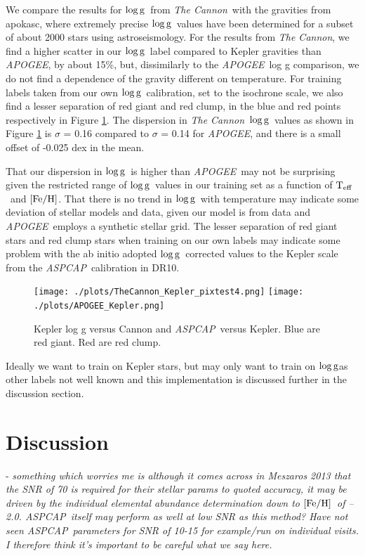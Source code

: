 \documentclass[12pt, preprint]{aastex}
\newcommand{\teff}{\mbox{$\rm T_{eff}$}}
\newcommand{\feh}{\mbox{$\rm [Fe/H]$}}
\newcommand{\logg}{\mbox{$\rm \log g$}}
\newcommand{\tc}{\textsl{The Cannon}}
\newcommand{\apogee}{\textsl{APOGEE}}
\newcommand{\aspcap}{\textsl{ASPCAP}}
\begin{document}
We compare the results for \logg\ from \tc\ with the gravities from apokasc, where extremely precise \logg\ values have been determined for a subset of about 2000 stars using astroseismology. For the results from \tc, we find a higher scatter in our \logg\ label compared to Kepler gravities than \textit{APOGEE}, by about 15\%, but, dissimilarly to the \apogee\ log g comparison, we do not find a dependence of the gravity different on temperature. For training labels taken from our own \logg\ calibration, set to the isochrone scale, we also find a lesser separation of red giant and red clump, in the blue and red points respectively in Figure \ref{fig:kepler}. The dispersion in \tc\ \logg\ values as shown in Figure \ref{fig:kepler} is $\sigma$ = 0.16 compared to $\sigma$ =  0.14 for \textit{APOGEE}, and there is a small offset of -0.025 dex in the mean. 

That our dispersion in \logg\ is higher than \apogee\ may not be surprising given the restricted range of \logg\ values in our training set as a function of \teff\ and \feh. That there is no trend in \logg\ with temperature may indicate some deviation of stellar models and data, given our model is from data and \apogee\ employs a synthetic stellar grid. The lesser separation of red giant stars and red clump stars when training on our own labels may indicate some problem with the ab initio adopted \logg\ corrected values to the Kepler scale from the \aspcap\ calibration in DR10.

  \begin{figure}[h!]
 \texttt{[image: ./plots/TheCannon\_Kepler\_pixtest4.png]}
  \texttt{[image: ./plots/APOGEE\_Kepler.png]}
 \caption{Kepler log g versus Cannon and \aspcap\ versus Kepler. Blue are red giant. Red are red clump.}
\label{fig:kepler}
\end{figure}


Ideally we want to train on Kepler stars, but may only want to train on \logg as other labels not well known and this implementation is discussed further in the discussion section. 


\section{Discussion}




- \textit{something which worries me is although it comes across in Meszaros 2013 that the SNR of 70 is required for their stellar params to quoted accuracy, it may be driven by the individual elemental abundance determination down to \feh\ of --2.0. \aspcap\ itself may perform as well at low SNR as this method? Have not seen \aspcap\ parameters for SNR of 10-15 for example/run on individual visits. I therefore think it's important to be careful what we say here.} \\
\end{document}
